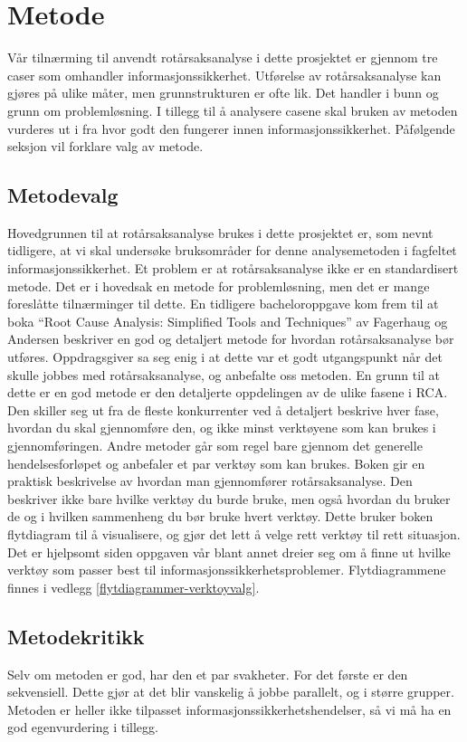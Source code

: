 \chapter{Metode}
\label{kap:metode}
Vår tilnærming til anvendt rotårsaksanalyse i dette prosjektet er gjennom tre caser som omhandler informasjonssikkerhet. Utførelse av rotårsaksanalyse kan gjøres på ulike måter, men grunnstrukturen er ofte lik. Det handler i bunn og grunn om problemløsning. I tillegg til å analysere casene skal bruken av metoden vurderes ut i fra hvor godt den fungerer innen informasjonssikkerhet. Påfølgende seksjon vil forklare valg av metode. 

\section{Metodevalg}
Hovedgrunnen til at rotårsaksanalyse brukes i dette prosjektet er, som nevnt tidligere, at vi skal undersøke bruksområder for denne analysemetoden i fagfeltet informasjonssikkerhet. Et problem er at rotårsaksanalyse ikke er en standardisert metode. Det er i hovedsak en metode for problemløsning, men det er mange foreslåtte tilnærminger til dette. En tidligere bacheloroppgave \cite{RCARapport} kom frem til at boka ``Root Cause Analysis: Simplified Tools and Techniques'' av Fagerhaug og Andersen \cite{RCA} beskriver en god og detaljert metode for hvordan rotårsaksanalyse bør utføres. Oppdragsgiver sa seg enig i at dette var et godt utgangspunkt når det skulle jobbes med rotårsaksanalyse, og anbefalte oss metoden. En grunn til at dette er en god metode er den detaljerte oppdelingen av de ulike fasene i RCA. Den skiller seg ut fra de fleste konkurrenter ved å detaljert beskrive hver fase, hvordan du skal gjennomføre den, og ikke minst verktøyene som kan brukes i gjennomføringen. Andre metoder går som regel bare gjennom det generelle hendelsesforløpet og anbefaler et par verktøy som kan brukes. Boken gir en praktisk beskrivelse av hvordan man gjennomfører rotårsaksanalyse. Den beskriver ikke bare hvilke verktøy du burde bruke, men også hvordan du bruker de og i hvilken sammenheng du bør bruke hvert verktøy. Dette bruker boken flytdiagram til å visualisere, og gjør det lett å velge rett verktøy til rett situasjon. Det er hjelpsomt siden oppgaven vår blant annet dreier seg om å finne ut hvilke verktøy som passer best til informasjonssikkerhetsproblemer. Flytdiagrammene finnes i vedlegg \ref{flytdiagrammer-verktoyvalg}.

\section{Metodekritikk}
Selv om metoden er god, har den et par svakheter. For det første er den sekvensiell. Dette gjør at det blir vanskelig å jobbe parallelt, og i større grupper. Metoden er heller ikke tilpasset informasjonssikkerhetshendelser, så vi må ha en god egenvurdering i tillegg. 